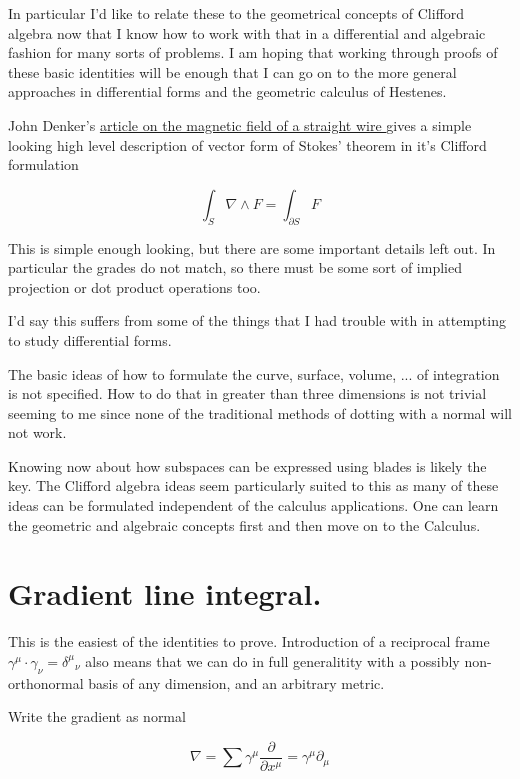 \documentclass{article}
\newcommand{\grad}[0]{\nabla}
\newcommand{\PD}[2]{\frac{\partial {#2}}{\partial {#1}}}
\begin{document}
In particular I'd like to relate these to the geometrical concepts
of Clifford algebra now that I know how to work with that in a 
differential and algebraic fashion for many sorts of problems.  I am hoping
that working through proofs of these basic identities 
will be enough that I can go on to the more general approaches in 
differential forms and the geometric calculus of Hestenes.

John Denker's 
\href{ http://www.av8n.com/physics/straight-wire.pdf }{ article on the
magnetic field of a straight wire }
gives a simple looking high level description of vector form of Stokes'
theorem in it's Clifford formulation

\begin{equation}\label{eqn:stokesGA}
\int_S \grad \wedge F = \int_{\partial S} F
\end{equation}

This is simple enough looking, but there are some important details left
out.  In particular the grades do not match, so there must be some sort of
implied projection or dot product operations too.

I'd say this suffers from some of the things that I had trouble with in
attempting to study differential forms.

The basic ideas of how to formulate
the curve, surface, volume, ... of integration is not specified.  How to do
that in greater than three dimensions is not trivial seeming to me since
none of the traditional methods of dotting with a normal will not work.

Knowing now about how subspaces can be expressed using blades is likely the
key.  The Clifford algebra ideas seem particularly suited to this as many
of these ideas can be formulated independent of the calculus applications.
One can learn the geometric and algebraic concepts first and then move on
to the Calculus.

\section{ Gradient line integral. }

This is the easiest of the identities to prove.  Introduction of a reciprocal frame $\gamma^{\mu} \cdot \gamma_{\nu} = {\delta^{\mu}}_{\nu}$
also means that we can do in full generalitity with a possibly
non-orthonormal basis of any dimension, and an arbitrary metric.

Write the gradient as normal

\begin{equation*}
\grad = \sum \gamma^{\mu} \PD{x^{\mu}}{} = \gamma^{\mu} \partial_{\mu}
\end{equation*}
\end{document}
